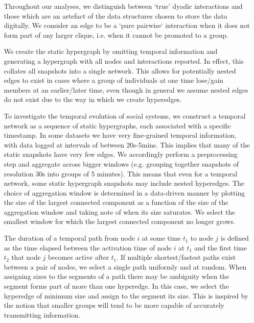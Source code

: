 \documentclass[a4paper,pre,reqno,superscriptaddress, twocolumn, floatfix]{revtex4}
\begin{document}
Throughout our analyses, we distinguish between `true' dyadic interactions and those which are an artefact of the data structures chosen to store the data digitally. We consider an edge to be a `pure pairwise` interaction when it does not form part of any larger clique, i.e. when it cannot be promoted to a group. 

We create the static hypergraph by omitting temporal information and generating a hypergraph with all nodes and interactions reported.  In effect, this collates all snapshots into a single network. This allows for potentially nested edges to exist in cases where a group of individuals at one time lose/gain members at an earlier/later time, even though in general we assume nested edges do not exist due to the way in which we create hyperedges.

To investigate the temporal evolution of social systems, we construct a temporal network as a sequence of static hypergraphs, each associated with a specific timestamp. In some datasets we have very fine-grained temporal information, with data logged at intervals of between 20s-5mins. This implies that many of the static snapshots have very few edges. We accordingly perform a preprocessing step and aggregate across bigger windows (e.g. grouping together snapshots of resolution 30s into groups of 5 minutes). This means that even for a temporal network, some static hypergraph snapshots may include nested hyperedges. The choice of aggregation window is determined in a data-driven manner by plotting the size of the largest connected component as a function of the size of the aggregation window and taking note of when its size saturates. We select the smallest window for which the largest connected component no longer grows.  

The duration of a temporal path from node $i$ at some time $t_1$ to node $j$ is defined as the time elapsed between the activation time of node $i$ at $t_1$ and the first time $t_2$ that node $j$ becomes active after $t_1$. 
If multiple shortest/fastest paths exist between a pair of nodes, we select a single path uniformly and at random. 
When assigning sizes to the segments of a path there may be ambiguity when the segment forms part of more than one hyperedge. In this case, we select the hyperedge of minimum size and assign to the segment its size. This is inspired by the notion that smaller groups will tend to be more capable of accurately transmitting information. 
\end{document}
